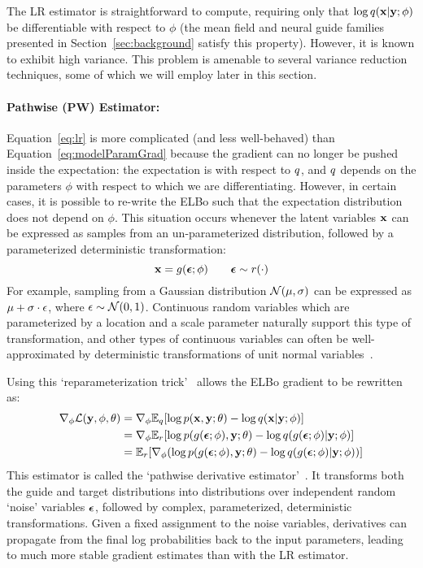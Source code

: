 The LR estimator is straightforward to compute, requiring only that $\log q(\mathbf{x} | \mathbf{y} ; \phi)$ be differentiable with respect to $\phi$ (the mean field and neural guide families presented in Section~\ref{sec:background} satisfy this property). However, it is known to exhibit high variance. This problem is amenable to several variance reduction techniques, some of which we will employ later in this section.

\paragraph{Pathwise (PW) Estimator:}

Equation~\ref{eq:lr} is more complicated (and less well-behaved) than Equation~\ref{eq:modelParamGrad} because the gradient can no longer be pushed inside the expectation: the expectation is with respect to $q$, and $q$ depends on the parameters $\phi$ with respect to which we are differentiating.
However, in certain cases, it is possible to re-write the ELBo such that the expectation distribution does not depend on $\phi$.
This situation occurs whenever the latent variables $\mathbf{x}$ can be expressed as samples from an un-parameterized distribution, followed by a parameterized deterministic transformation:
\begin{equation*}
\mathbf{x} = g(\bm{\epsilon} ; \phi) \hspace{2em} \bm{\epsilon} \sim r(\cdot)
\end{equation*}
For example, sampling from a Gaussian distribution $\mathcal{N}(\mu, \sigma)$ can be expressed as $\mu + \sigma \cdot \epsilon$, where $\epsilon \sim \mathcal{N}(0, 1)$. Continuous random variables which are parameterized by a location and a scale parameter naturally support this type of transformation, and other types of continuous variables can often be well-approximated by deterministic transformations of unit normal variables~\cite{ADVI}.

Using this `reparameterization trick'~\cite{AEVB} allows the ELBo gradient to be rewritten as:
\begin{align}
\begin{split}
\nabla_\phi \mathcal{L}(\mathbf{y}, \phi, \theta)
&= \nabla_\phi \mathbb{E}_{q}[ \log p(\mathbf{x}, \mathbf{y}; \theta) - \log q(\mathbf{x} | \mathbf{y} ; \phi) ]\\
&= \nabla_\phi \mathbb{E}_{r} [ \log p(g(\bm{\epsilon} ; \phi), \mathbf{y} ; \theta) - \log q(g(\bm{\epsilon} ; \phi) | \mathbf{y} ; \phi) ]\\
&= \mathbb{E}_{r} [\nabla_\phi ( \log p(g(\bm{\epsilon} ; \phi), \mathbf{y} ; \theta) - \log q(g(\bm{\epsilon} ; \phi) | \mathbf{y} ; \phi) ) ]
\end{split}
\label{eq:pw}
\end{align}
This estimator is called the `pathwise derivative estimator'~\cite{PathwiseEstimator}.
It transforms both the guide and target distributions into distributions over independent random `noise' variables $\bm{\epsilon}$, followed by complex, parameterized, deterministic transformations. Given a fixed assignment to the noise variables, derivatives can propagate from the final log probabilities back to the input parameters, leading to much more stable gradient estimates than with the LR estimator.

